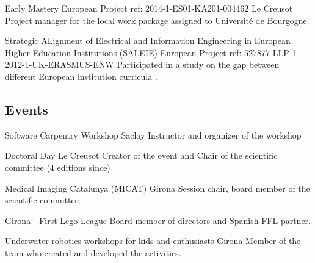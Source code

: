 {Early Mastery}
{European Project ref: 2014-1-ES01-KA201-004462}
{}
{Le Creusot}
{
  Project manager for the local work package assigned to Université de Bourgogne.
}

{Strategic ALignment of Electrical and Information Engineering in European
  Higher Education Institutions (SALEIE)}
{European Project ref: 527877-LLP-1-2012-1-UK-ERASMUS-ENW}
{}
{}
{
  Participated in a study on the gap between different European institution curricula \parencite{ligusova2014reflections}.
}

\subsection{Events}

  {Software Carpentry Workshop}
  {}{}{Saclay}
  {Instructor and organizer of the workshop}

  {Doctoral Day}
  {}{}{Le Creusot}
  {Creator of the event and Chair of the scientific committee (4 editions since)}

  {Medical Imaging Catalunya (MICAT) }
  {}{}{Girona}
  {Session chair, board member of the scientific committee}

{Girona - First Lego League}
{}
{}
{}
{Board member of directors and Spanish FFL partner.
}

{
  Underwater robotics workshops for kids and enthusiasts
}
{}
{}
{Girona}
{
  Member of the team who created and developed the activities.
}

